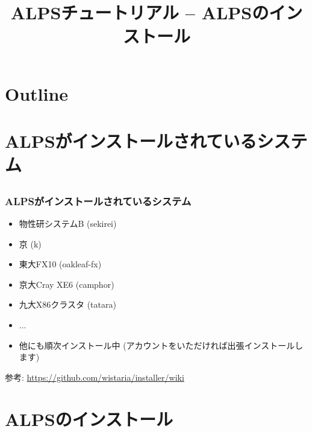 \title{ALPSチュートリアル -- ALPSのインストール}



\begin{frame}
  \titlepage
\end{frame}

\section*{Outline}
\begin{frame}
  \tableofcontents
\end{frame}

\section{ALPSがインストールされているシステム}
\subsection*{\redm\whiteb\greenb}

\begin{frame}[fragile]
  \frametitle{ALPSがインストールされているシステム}
  \begin{itemize}
  \item 物性研システムB (sekirei)
  \item 京 (k)
  \item 東大FX10 (oakleaf-fx)
  \item 京大Cray XE6 (camphor)
  \item 九大X86クラスタ (tatara)
  \item ...
  \item 他にも順次インストール中 (アカウントをいただければ出張インストールします)
  \end{itemize}
\begin{semiverbatim}
参考: {\footnotesize \url{https://github.com/wistaria/installer/wiki}}
\end{semiverbatim}
\end{frame}

\section{ALPSのインストール}
\subsection*{\redm\whiteb\greenb}

